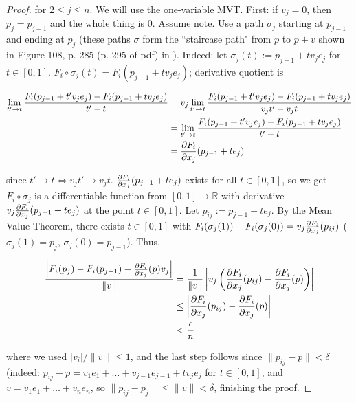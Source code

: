 \begin{proof}
for \(2 \leq j \leq n\). We will use the one-variable MVT. First: if \(v_j = 0\), then \(p_j = p_{j-1}\) and the whole thing is 0. Assume note. Use a path \(\sigma_j\) starting at \(p_{j-1}\) and ending at \(p_j\) (these paths \(\sigma\) form the ``staircase path" from \(p\) to \(p+v\) shown in Figure 108, p. 285 (p. 295 of pdf) in \citet{pugh2015real}). Indeed: let \(\sigma_j(t) := p_{j-1} + t v_j e_j\) for \(t \in[0,1]\). \(F_i \circ \sigma_j(t) = F_i(p_{j-1} + t v_j e_j)\); derivative quotient is 

\begin{align*}
\lim_{t' \to t} \frac{F_i(p_{j-1} + t' v_j e_j) - F_i(p_{j-1} + t v_j e_j) }{t' - t} & = v_j \lim_{t' \to t} \frac{F_i(p_{j-1} + t' v_j e_j) - F_i(p_{j-1} + t v_j e_j) }{v_j t' - v_j t} 
\\ & =  \lim_{t' \to t} \frac{F_i(p_{j-1} + t' v_j e_j) - F_i(p_{j-1} + t v_j e_j) }{ t' - t} 
\\ & = \pderiv{F_i}{x_j}(p_{j-1} + t e_j)
\end{align*} 

since \(t' \to t \iff v_j t' \to v_jt\). \(\pderiv{F_i}{x_j}(p_{j-1} + t e_j)\) exists for all \(t \in [0,1]\), so we get \(F_i \circ \sigma_j\) is a differentiable function from \([0,1] \to \mathbb{R}\) with derivative \(v_j \pderiv{F_i}{x_j} (p_{j-1} + t e_j)\) at the point \(t \in [0,1]\). Let \(p_{ij} := p_{j-1} + t e_j\). By the Mean Value Theorem, there exists \(t \in [0,1]\) with \(F_i(\sigma_j(1)) - F_i(\sigma_j(0)) = v_j \pderiv{F_i}{x_j} (p_{ij}) \) (\(\sigma_j(1) = p_j\), \(\sigma_j(0) = p_{j-1}\)). Thus,

\begin{align*}
\frac{ \left| F_i(p_j) - F_i(p_{j-1}) - \pderiv{F_i}{x_j}(p) v_j \right|}{\lVert v \rVert} & = \frac{1}{\lVert v \rVert} \left| v_j \left( \pderiv{F_i}{x_j}(p_{ij}) - \pderiv{F_i}{x_j}(p) \right) \right|
\\ & \leq \left| \pderiv{F_i}{x_j}(p_{ij}) - \pderiv{F_i}{x_j}(p) \right|
\\   & < \frac{\epsilon}{n}
\end{align*}

where we used \(| v_i|/\lVert v \rVert \leq 1\), and the last step follows since \(\lVert p_{ij} - p \rVert < \delta\) (indeed: \(p_{ij} - p = v_1 e_1 + \ldots + v_{j-1} e_{j-1} + t v_j e_j\) for \(t \in [0,1]\), and \(v = v_1 e_1 + \ldots + v_n e_n\), so \( \lVert p_{ij} - p_j \rVert \leq \lVert v \rVert < \delta\), finishing the proof.
  
  \end{proof}
  
